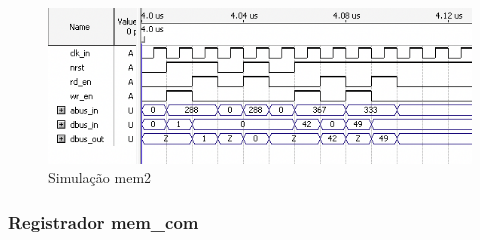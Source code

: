 \documentclass{article}
\begin{document}
\begin{figure}[ht]
\begin{center}
        \includegraphics[width=15cm]{images/ram-mem2.png}
        \caption{Simulação mem2}
\end{center}
\end{figure}

\subsubsection{Registrador mem\_com}
\end{document}
